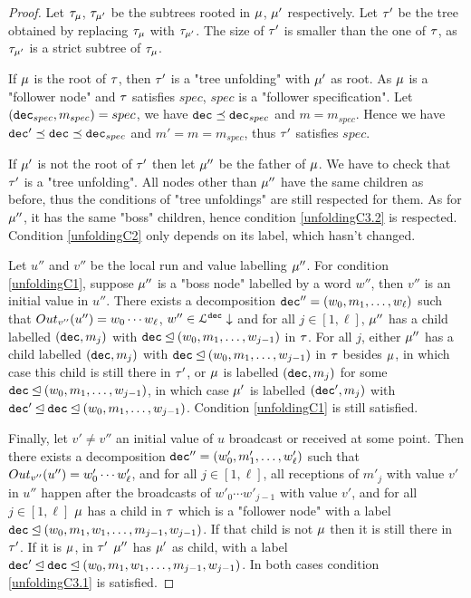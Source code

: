 \ifproofs
\begin{proof}
		Let $\tau_{\mu}$, $\tau_{\mu'}$ be the subtrees rooted in $\mu$, $\mu'$ respectively. 
	Let $\tau'$ be the tree obtained by replacing $\tau_{\mu}$ with $\tau_{\mu'}$. The size of $\tau'$ is smaller than the one of $\tau$, as $\tau_{\mu'}$ is a strict subtree of $\tau_{\mu}$.
	
	If $\mu$ is the root of $\tau$, then $\tau'$ is a "tree unfolding" with $\mu'$ as root. As $\mu$ is a "follower node" and $\tau$ satisfies $spec$, $spec$ is a "follower specification". Let $(\mathtt{dec}_{spec}, m_{spec}) = spec$, we have $\mathtt{dec} \preceq \mathtt{dec}_{spec}$ and $m = m_{spec}$. 
	Hence we have $\mathtt{dec}' \preceq \mathtt{dec} \preceq \mathtt{dec}_{spec}$ and $m' = m = m_{spec}$, thus $\tau'$ satisfies $spec$.
	
	If  $\mu'$ is not the root of $\tau'$ then let $\mu''$ be the father of $\mu$. We have to check that $\tau'$ is a "tree unfolding". 
	All nodes other than $\mu''$ have the same children as before, thus the conditions of "tree unfoldings" are still respected for them.
	As for $\mu''$, it has the same "boss" children, hence condition \ref{unfoldingC3.2} is respected. Condition \ref{unfoldingC2} only depends on its label, which hasn't changed.
	
	Let $u''$ and $v''$ be the local run and value labelling $\mu''$.
	For condition \ref{unfoldingC1}, suppose $\mu''$ is a "boss node" labelled by a word $w''$, then $v''$ is an initial value in $u''$. There exists a decomposition $\mathtt{dec}'' = (w_0, m_1, \ldots, w_\ell)$ such that $\voutput{v''}{u''} = w_0\cdots w_\ell$, $w''\in \mathcal{L}^{\mathtt{\mathtt{dec}}}\downarrow$ and for all $j \in [1,\ell]$, $\mu''$ has a child labelled $(\mathtt{dec},m_j)$ with $\mathtt{dec} \unlhd (w_0, m_1, \ldots, w_{j-1})$ in $\tau$.
	For all $j$, either $\mu''$ has a child labelled $(\mathtt{dec},m_j)$ with $\mathtt{dec} \unlhd (w_0, m_1, \ldots, w_{j-1})$ in $\tau$ besides $\mu$, in which case this child is still there in $\tau'$, or $\mu$ is labelled $(\mathtt{dec},m_j)$ for some $\mathtt{dec} \unlhd (w_0, m_1, \ldots, w_{j-1})$, in which case $\mu'$ is labelled $(\mathtt{dec}', m_j)$ with  $\mathtt{dec}' \unlhd \mathtt{dec} \unlhd (w_0, m_1, \ldots, w_{j-1})$.
	Condition \ref{unfoldingC1} is still satisfied.
	
	Finally, let $v' \neq v''$ an initial value of $u$ broadcast or received at some point.
	Then there exists a decomposition $\mathtt{dec}'' = (w'_0, m'_1, \ldots, w'_\ell)$ such that $\voutput{v''}{u''} = w'_0\cdots w'_\ell$, and for all $j \in [1,\ell]$, all receptions of $m'_j$ with value $v'$ in $u''$ happen after the broadcasts of $w'_0\cdots w'_{j-1}$ with value $v'$, and for all $j \in [1,\ell]$ $\mu$ has a child in $\tau$ which is a "follower node" with a label $\mathtt{dec} \unlhd (w_0, m_1, w_1, \ldots, m_{j-1}, w_{j-1})$.
	If that child is not $\mu$ then it is still there in $\tau'$. If it is $\mu$, in $\tau'$ $\mu''$ has $\mu'$ as child, with a label $\mathtt{dec}' \unlhd \mathtt{dec} \unlhd (w_0, m_1, w_1, \ldots, m_{j-1}, w_{j-1})$.
	In both cases condition \ref{unfoldingC3.1} is satisfied.
	

\end{proof}
